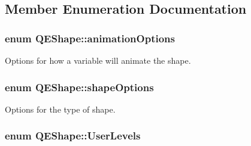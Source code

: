 \subsection{Member Enumeration Documentation}
\hypertarget{classQEShape_ae817ce1f72776774184d545dca59eec2}{
\subsubsection[{animationOptions}]{\setlength{\rightskip}{0pt plus 5cm}enum {\bf QEShape::animationOptions}}}
\label{classQEShape_ae817ce1f72776774184d545dca59eec2}
Options for how a variable will animate the shape. \hypertarget{classQEShape_a159b98721912181fdf5e3014173558ef}{
\subsubsection[{shapeOptions}]{\setlength{\rightskip}{0pt plus 5cm}enum {\bf QEShape::shapeOptions}}}
\label{classQEShape_a159b98721912181fdf5e3014173558ef}
Options for the type of shape. \hypertarget{classQEShape_a090921156d1b46560ff0fc1bacad18dd}{
\subsubsection[{UserLevels}]{\setlength{\rightskip}{0pt plus 5cm}enum {\bf QEShape::UserLevels}}}
\label{classQEShape_a090921156d1b46560ff0fc1bacad18dd}
